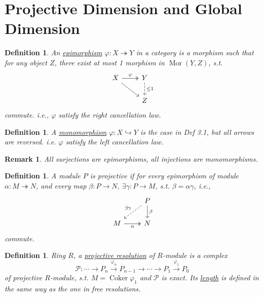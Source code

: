 \documentclass[11pt]{article}
\DeclareMathOperator{\Coker}{Coker}
\newtheorem{definition}[theorem]{Definition}
\newtheorem{remark}[theorem]{Remark}
\begin{document}
\section{Projective Dimension and Global Dimension}

\begin{definition}
    An \underline{epimorphism} $\varphi: X \twoheadrightarrow Y$ in a category is a morphism such that for any object $Z$, there exist at most 1 morphism in $\operatorname{Mor}(Y, Z)$, s.t.
    $$
        \begin{tikzcd}
            X \arrow[r, "\varphi", two heads] \arrow[dr] & Y \arrow[d, dashed, "\le 1"] \\
            & Z
        \end{tikzcd}
    $$
    commute. i.e., $\varphi$ satisfy the right cancellation law.
\end{definition}

\begin{definition}
    A \underline{monomorphism} $\varphi: X \hookrightarrow Y$ is the case in Def 3.1, but all arrows are reversed. i.e. $\varphi$ satisfy the left cancellation law.
\end{definition}

\begin{remark}
    All surjections are epimorphisms, all injections are monomorphisms.
\end{remark}

\begin{definition}
    A module $P$ is projective if for every epimorphism of module $\alpha: M \twoheadrightarrow N$, and every map $\beta: P \to N$, $\exists \gamma: P \to M$, s.t. $\beta = \alpha \gamma$, i.e.,
    $$
        \begin{tikzcd}
            & P \arrow[dl, dashed, "\exists \gamma"'] \arrow[d, "\beta"] \\
            M \arrow[r, two heads, "\alpha"'] & N
        \end{tikzcd}
    $$
    commute.
\end{definition}

\begin{definition}
    Ring $R$, a \underline{projective resolution} of $R$-module is a complex
    $$ \mathcal{P}: \cdots \to P_n \xrightarrow{\varphi_n} P_{n-1} \to \cdots \to P_1 \xrightarrow{\varphi_1} P_0 $$
    of projective $R$-module, s.t. $M = \Coker \varphi_1$ and $\mathcal{P}$ is exact.
    Its \underline{length} is defined in the same way as the one in free resolutions.
\end{definition}
\end{document}
